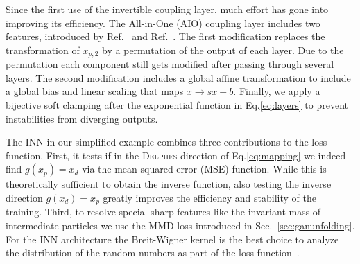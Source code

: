 Since the first use of the invertible coupling layer, much effort has
gone into improving its efficiency. The All-in-One (AIO) coupling
layer includes two features, introduced by Ref.~\cite{coupling2} and
Ref.~\cite{glow}. The first modification replaces the transformation
of $x_{p,2}$ by a permutation of the output of each layer. Due to the
permutation each component still gets modified after passing through
several layers. The second modification includes a global affine transformation
to include a global bias and linear scaling that maps $x \rightarrow s
x + b$. Finally, we apply a bijective soft clamping after the
exponential function in Eq.\eqref{eq:layers} to prevent instabilities
from diverging outputs.

The INN in our simplified example combines three contributions to the
loss function. First, it tests if in the \textsc{Delphes} direction of
Eq.\eqref{eq:mapping} we indeed find $g(x_p) = x_d$ via the mean
squared error (MSE) function. While this is theoretically sufficient
to obtain the inverse function, also testing the inverse direction
$\bar{g}(x_d) = x_p$ greatly improves the efficiency and stability of
the training. Third, to resolve special sharp features like the
invariant mass of intermediate particles we use the MMD loss introduced 
in Sec.~\ref{sec:ganunfolding}. 
For the INN architecture the Breit-Wigner kernel is the best choice to analyze the
distribution of the random numbers as part of the loss
function~\cite{inn}.

